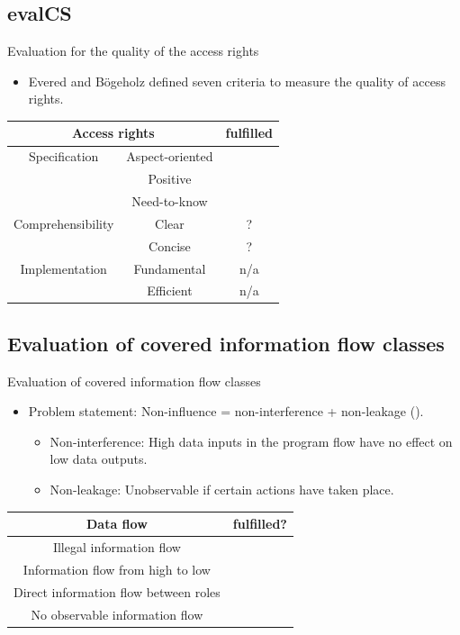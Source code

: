 \documentclass[18pt]{beamer}
\newcommand{\cmark}{\ding{51}}
\newcommand{\xmark}{\ding{55}}%
\begin{document}
\subsection{evalCS}
\begin{frame}{Evaluation for the quality of the access rights}
\begin{itemize}
\item Evered and B\"ogeholz defined seven criteria to measure the quality of access rights.
\end{itemize}
\begin{table}
\centering
\begin{tabular}{|c|c|c|}
\hline 
\multicolumn{2}{|c|}{Access rights} & fulfilled \\ 
\hline 
Specification & Aspect-oriented & \cmark \\ 
\hline 
 & Positive & \cmark \\ 
\hline 
 & Need-to-know & \cmark \\ 
\hline 
Comprehensibility & Clear & ? \\ 
\hline 
 & Concise & ? \\ 
\hline 
Implementation & Fundamental & n/a \\ 
\hline 
 & Efficient & n/a \\ 
\hline 
\end{tabular} 

 
\end{table} 
\end{frame}

\subsection{Evaluation of covered information flow classes}
\begin{frame}{Evaluation of covered information flow classes}
\begin{itemize}
\item Problem statement: Non-influence = non-interference + non-leakage (\cite{Noninfluence}).
\begin{itemize}
\item Non-interference:  High data inputs in the program flow have no effect on low data outputs. 
\item Non-leakage: Unobservable if certain actions have taken place.
\end{itemize}
\end{itemize}


\pause
\begin{table}
\centering
\begin{tabular}{|c|c|} 
\hline 
Data flow & fulfilled? \\ 
\hline 
Illegal information flow & \cmark \\ 
\hline 
Information flow from high to low & \cmark \\  
\hline 
Direct information flow between roles & \xmark \\ 
\hline 
No observable information  flow & \xmark \\
\hline 
\end{tabular}
\end{table}
\end{frame}
\end{document}
